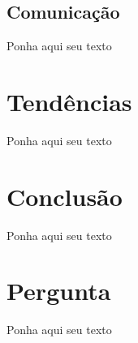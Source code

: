 \documentclass[aspectratio=169]{beamer}
\begin{document}
	\subsection{Comunicação}
			
	\begin{frame} 
		Ponha aqui seu texto
	\end{frame}

\section{Tendências}
	\begin{frame} 
		Ponha aqui seu texto
	\end{frame}

\section{Conclusão}
	\begin{frame} 
		Ponha aqui seu texto
	\end{frame}
		
\section{Pergunta}
	\begin{frame} 
		Ponha aqui seu texto
	\end{frame}
	
\end{document}
